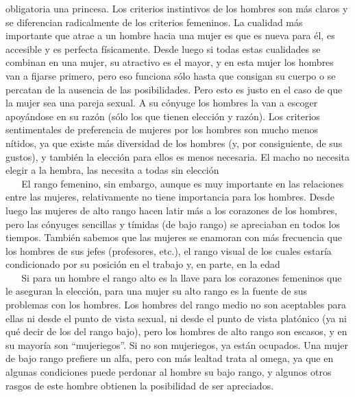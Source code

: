 obligatoria una princesa. Los criterios instintivos de los hombres son
más claros y se diferencian radicalmente de los criterios femeninos. La
cualidad más importante que atrae a un hombre hacia una mujer es que es
nueva para él, es accesible y es perfecta físicamente. Desde luego si
todas estas cualidades se combinan en una mujer, su atractivo es el
mayor, y en esta mujer los hombres van a fijarse primero, pero eso
funciona sólo hasta que consigan su cuerpo o se percatan de la ausencia
de las posibilidades. Pero esto es justo en el caso de que la mujer sea
una pareja sexual. A su cónyuge los hombres la van a escoger apoyándose
en su razón (sólo los que tienen elección y razón). Los criterios
sentimentales de preferencia de mujeres por los hombres son mucho menos
nítidos, ya que existe más diversidad de los hombres (y, por
consiguiente, de sus gustos), y también la elección para ellos es menos
necesaria. El macho no necesita elegir a la hembra, las necesita a todas
sin elección\\
\hspace*{0.333em} ~ ~ El rango femenino, sin embargo, aunque es muy
importante en las relaciones entre las mujeres, relativamente no tiene
importancia para los hombres. Desde luego las mujeres de alto rango
hacen latir más a los corazones de los hombres, pero las cónyuges
sencillas y tímidas (de bajo rango) se apreciaban en todos los tiempos.
También sabemos que las mujeres se enamoran con más frecuencia que los
hombres de sus jefes (profesores, etc.), el rango visual de los cuales
estaría condicionado por su posición en el trabajo y, en parte, en la
edad\\
\hspace*{0.333em} ~ ~ Si para un hombre el rango alto es la llave para
los corazones femeninos que le aseguran la elección, para una mujer su
alto rango es la fuente de sus problemas con los hombres. Los hombres
del rango medio no son aceptables para ellas ni desde el punto de vista
sexual, ni desde el punto de vista platónico (ya ni qué decir de los del
rango bajo), pero los hombres de alto rango son escasos, y en su mayoría
son ``mujeriegos''. Si no son mujeriegos, ya están ocupados. Una mujer
de bajo rango prefiere un alfa, pero con más lealtad trata al omega, ya
que en algunas condiciones puede perdonar al hombre su bajo rango, y
algunos otros rasgos de este hombre obtienen la posibilidad de ser
apreciados.

